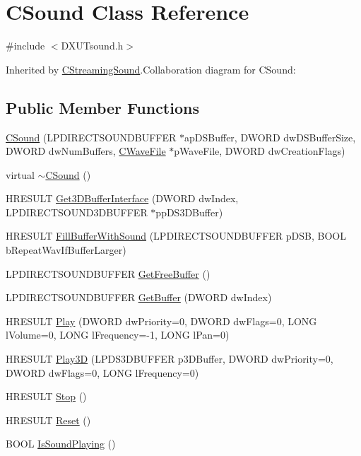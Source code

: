 \hypertarget{class_c_sound}{
\section{CSound Class Reference}
\label{class_c_sound}
}


{\ttfamily \#include $<$DXUTsound.h$>$}

Inherited by \hyperlink{class_c_streaming_sound}{CStreamingSound}.Collaboration diagram for CSound:\subsection*{Public Member Functions}
\begin{DoxyCompactItemize}
\item 
\hyperlink{class_c_sound_aa9aaa0a90651513608392e520a19bedf}{CSound} (LPDIRECTSOUNDBUFFER $\ast$apDSBuffer, DWORD dwDSBufferSize, DWORD dwNumBuffers, \hyperlink{class_c_wave_file}{CWaveFile} $\ast$pWaveFile, DWORD dwCreationFlags)
\item 
virtual \hyperlink{class_c_sound_afe00e938f0c637e80ae2e3d30faa5add}{$\sim$CSound} ()
\item 
HRESULT \hyperlink{class_c_sound_a8cc12b7a0c95af64112dd511b93fff79}{Get3DBufferInterface} (DWORD dwIndex, LPDIRECTSOUND3DBUFFER $\ast$ppDS3DBuffer)
\item 
HRESULT \hyperlink{class_c_sound_a5591cb7ebe3a9cb04e2a57fba3462510}{FillBufferWithSound} (LPDIRECTSOUNDBUFFER pDSB, BOOL bRepeatWavIfBufferLarger)
\item 
LPDIRECTSOUNDBUFFER \hyperlink{class_c_sound_a270ce46e674cb5f39fecfbbee8f45b41}{GetFreeBuffer} ()
\item 
LPDIRECTSOUNDBUFFER \hyperlink{class_c_sound_a74133e53b2e5393eef4048036c9d2d61}{GetBuffer} (DWORD dwIndex)
\item 
HRESULT \hyperlink{class_c_sound_a9c0e5e3cf50601f679d17a38036cef14}{Play} (DWORD dwPriority=0, DWORD dwFlags=0, LONG lVolume=0, LONG lFrequency=-\/1, LONG lPan=0)
\item 
HRESULT \hyperlink{class_c_sound_aac53e4ca27f447ca2477d3e9ab50938a}{Play3D} (LPDS3DBUFFER p3DBuffer, DWORD dwPriority=0, DWORD dwFlags=0, LONG lFrequency=0)
\item 
HRESULT \hyperlink{class_c_sound_af394d295721d4d8bf05dd20531b4cf91}{Stop} ()
\item 
HRESULT \hyperlink{class_c_sound_aaf2b066d599976ba180082b4fa3880e3}{Reset} ()
\item 
BOOL \hyperlink{class_c_sound_ae4677b9565a96892a3a494698392670b}{IsSoundPlaying} ()
\end{DoxyCompactItemize}
